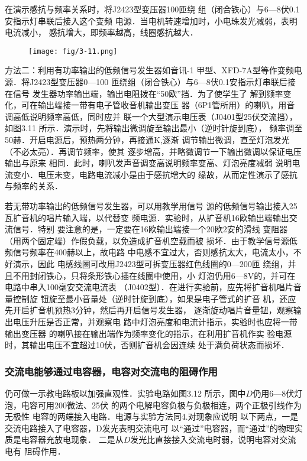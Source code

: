在演示感抗与频率关系时，将J2423型变压器100匝绕
组（闭合铁心）与6—8伏0.1安指示灯串联后接入这个变频
电源．当电机转速增加时，小电珠发光减弱，表明电流减小，
感抗增大，即频率越高，线圈感抗越大．

\begin{figure}[htp]
    \centering
\texttt{[image: fig/3-11.png]}
    \caption{}
\end{figure}

方法二：利用有功率输出的低频信号发生器如音讯-1
甲型、XFD-7A型等作变频电源．将J2423型变压器0—100
匝绕组（闭合铁心）与6—8伏0.1安指示灯串联后接在信号
发生器功率输出端，输出电阻拨在“50欧”挡．为了使学生了
解到频率变化，可在输出端接一带有电子管收音机输出变压
器（6P1管所用）的喇叭，用音调高低说明频率高低，同时应并
联一个大型演示电压表（J0401型25伏交流挡），如图3.11
所示．演示时，先将输出微调旋至输出最小（逆时针旋到底），
频率调至50赫．开启电源后，预热两分钟，再接通K,逐渐
调节输出微调，直至灯泡发光（不必太亮）．再调节频率，使其
逐步增高，并略微调节一下输出微调以保证电压输出与原来
相同．此时，喇叭发声音调变高说明频率变高、灯泡亮度减弱
说明电流变小．电压未变，电路电流减小是由于感抗增大的
缘故，从而定性演示了感抗与频率的关系．

若无带功率输出的低频信号发生器，可以用教学用信号
源的低频信号输出接入25瓦扩音机的唱片输入端，以代替变
频电源．实验时，从扩音机16欧输出端输出交流信号．特别
要注意的是，一定要在16欧输出端接一个20欧2安的滑线
变阻器（用两个固定端）作假负载，以免造成扩音机空载而被
损坏．由于教学信号源低频信号频率在400赫以上，故电路
中电感不宜过大，否则感抗太大，电流太小，不好演示，因此
电感线圈可改用J2423型可拆变压器红色线圈的0—200匝
绕组，并且不用封闭铁心，只将条形铁心插在线圈中使用，小
灯泡仍用6—8V的，并可在电路中串入100毫安交流电流表
（J0402型）．在进行实验前，应先将扩音机唱片音量控制旋
钮旋至最小音量处（逆时针旋到底），如果是电子管式的扩音
机，还应先开启扩音机预热3分钟，然后再开启信号发生器，
逐渐旋动唱片音量钮，观察输出电压升压是否正常，并观察电
路中灯泡亮度和电流计指示，实验时也应将一带输出变压器
的喇叭接在输出端作为频率变化的指示，在利用扩音机作实
验电源时，其输出电压不宜超过10伏，否则扩音机会因连续
处于满负荷状态而损坏．

\subsubsection{交流电能够通过电容器，电容对交流电的阻碍作用}
仍可做一示教电路板以加强直观性．实验电路如图3.12
所示，图中$D$仍用6—8伏灯泡，电容可用200微法、25伏
的两个电解电容负极与负极相连，两个正极引线作为无极性
电容的两端接入电路．电源与实验方法同4.对现象应说明
以下两点，一是交流电路接入了电容器，D发光表明交流电可
以“通过”电容器，而“通过”的物理实质是电容器充放电现象．
二是从$D$发光比直接接入交流电时弱，说明电容对交流电有
阻碍作用．

